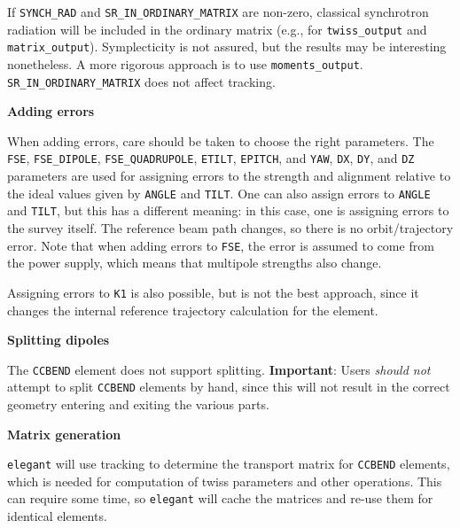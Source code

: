 If \verb|SYNCH_RAD| and \verb|SR_IN_ORDINARY_MATRIX| are non-zero, classical synchrotron radiation will be included in
the ordinary matrix (e.g., for \verb|twiss_output| and \verb|matrix_output|).  Symplecticity is not assured, but the results may
be interesting nonetheless. A more rigorous approach is to use \verb|moments_output|.
\verb|SR_IN_ORDINARY_MATRIX| does not affect tracking.

{\bf Adding errors}

When adding errors, care should be taken to choose the right
parameters.  The \verb|FSE|, \verb|FSE_DIPOLE|, \verb|FSE_QUADRUPOLE|, \verb|ETILT|, \verb|EPITCH|, and
\verb|YAW|, \verb|DX|, \verb|DY|, and \verb|DZ| parameters are used for
assigning errors to the strength and alignment relative to the ideal
values given by \verb|ANGLE| and \verb|TILT|.  One can also assign 
errors to \verb|ANGLE| and \verb|TILT|, but this has a different meaning:
in this case, one is assigning errors to the survey itself.  The reference
beam path changes, so there is no orbit/trajectory error.  Note that when
adding errors to \verb|FSE|, the error is assumed to come from the power
supply, which means that multipole strengths also change.

Assigning errors to \verb|K1| is also possible, but is not the best approach, since
it changes the internal reference trajectory calculation for the element.

{\bf Splitting dipoles}

The \verb|CCBEND| element does not support splitting.
{\bf Important}: Users {\em should not} attempt to split \verb|CCBEND| elements by hand, since this
will not result in the correct geometry entering and exiting the various parts.

{\bf Matrix generation}

{\tt elegant} will use tracking to determine the transport matrix for \verb|CCBEND| elements, which 
is needed for computation of twiss parameters and other operations.
This can require some time, so {\tt elegant} will cache the matrices and re-use them for
identical elements.

